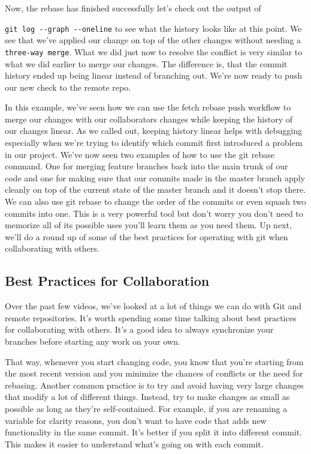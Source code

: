 Now, the rebase has finished successfully let's check out the output of

\verb|git log --graph --oneline| to see what the history looks like at this point. We see that we've applied our change on top of the other changes without needing a \verb|three-way merge|. What we did just now to resolve the conflict is very similar to what we did earlier to merge our changes. The difference is, that the commit history ended up being linear instead of branching out. We're now ready to push our new check to the remote repo.

In this example, we've seen how we can use the fetch rebase push workflow to merge our changes with our collaborators changes while keeping the history of our changes linear. 
As we called out, keeping history linear helps with debugging especially when we're trying to identify which commit first introduced a problem in our project. 
We've now seen two examples of how to use the git rebase command. 
One for merging feature branches back into the main trunk of our code and one for making sure that our commits made in the master branch apply cleanly on top of the current state of the master branch and it doesn't stop there. We can also use git rebase to change the order of the commits or even squash two commits into one. 
This is a very powerful tool but don't worry you don't need to memorize all of its possible uses you'll learn them as you need them. 
Up next, we'll do a round up of some of the best practices for operating with git when collaborating with others.

\subsection{Best Practices for Collaboration} \label{W303e}

Over the past few videos, we've looked at a lot of things we can do with Git and remote repositories. It's worth spending some time talking about best practices for collaborating with others. It's a good idea to always synchronize your branches before starting any work on your own.

That way, whenever you start changing code, you know that you're starting from the most recent version and you minimize the chances of conflicts or the need for rebasing. Another common practice is to try and avoid having very large changes that modify a lot of different things. Instead, try to make changes as small as possible as long as they're self-contained. For example, if you are renaming a variable for clarity reasons, you don't want to have code that adds new functionality in the same commit. It's better if you split it into different commit. This makes it easier to understand what's going on with each commit.

